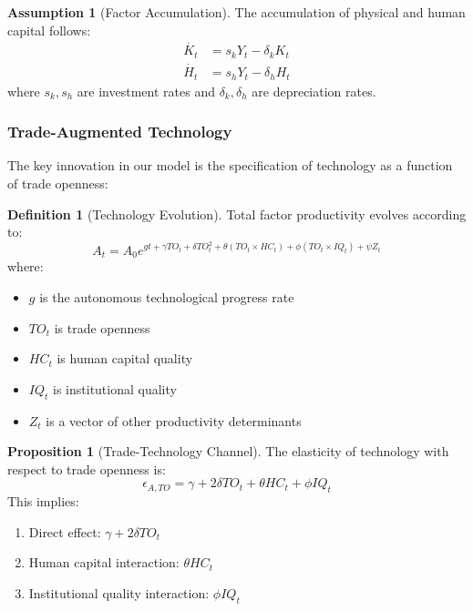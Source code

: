 \documentclass[12pt,a4paper]{article}
\theoremstyle{definition}
\newtheorem{definition}{Definition}
\newtheorem{assumption}{Assumption}
\newtheorem{proposition}{Proposition}
\begin{document}
\begin{assumption}[Factor Accumulation]
The accumulation of physical and human capital follows:
\begin{align}
\dot{K_t} &= s_k Y_t - \delta_k K_t \\
\dot{H_t} &= s_h Y_t - \delta_h H_t
\end{align}
where $s_k, s_h$ are investment rates and $\delta_k, \delta_h$ are depreciation rates.
\end{assumption}

\subsubsection{Trade-Augmented Technology}
The key innovation in our model is the specification of technology as a function of trade openness:

\begin{definition}[Technology Evolution]
Total factor productivity evolves according to:
\begin{equation}
A_t = A_0 e^{gt + \gamma TO_t + \delta TO_t^2 + \theta (TO_t \times HC_t) + \phi (TO_t \times IQ_t) + \psi Z_t}
\end{equation}
where:
\begin{itemize}
    \item $g$ is the autonomous technological progress rate
    \item $TO_t$ is trade openness
    \item $HC_t$ is human capital quality
    \item $IQ_t$ is institutional quality
    \item $Z_t$ is a vector of other productivity determinants
\end{itemize}
\end{definition}

\begin{proposition}[Trade-Technology Channel]
The elasticity of technology with respect to trade openness is:
\begin{equation}
\epsilon_{A,TO} = \gamma + 2\delta TO_t + \theta HC_t + \phi IQ_t
\end{equation}
This implies:
\begin{enumerate}
    \item Direct effect: $\gamma + 2\delta TO_t$
    \item Human capital interaction: $\theta HC_t$
    \item Institutional quality interaction: $\phi IQ_t$
\end{enumerate}
\end{proposition}
\end{document}
